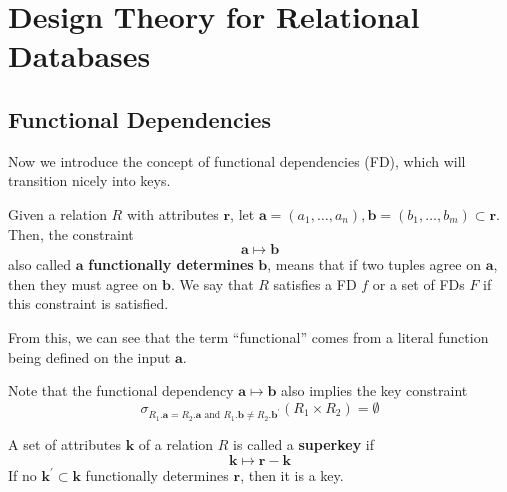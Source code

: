 \documentclass{article}
\begin{document}
\section{Design Theory for Relational Databases}

  \subsection{Functional Dependencies}

    Now we introduce the concept of functional dependencies (FD), which will transition nicely into keys.  

    \begin{definition}
      Given a relation $R$ with attributes $\mathbf{r}$, let $\mathbf{a} = (a_1, \ldots, a_n), \mathbf{b} = (b_1, \ldots, b_m) \subset \mathbf{r}$. Then, the constraint 
      \begin{equation}
        \mathbf{a} \mapsto \mathbf{b}
      \end{equation}
      also called $\mathbf{a}$ \textbf{functionally determines} $\mathbf{b}$, means that if two tuples agree on $\mathbf{a}$, then they must agree on $\mathbf{b}$. We say that $R$ satisfies a FD $f$ or a set of FDs $F$ if this constraint is satisfied. 
    \end{definition}

    From this, we can see that the term ``functional'' comes from a literal function being defined on the input $\mathbf{a}$. 

    \begin{lemma}
      Note that the functional dependency $\mathbf{a} \mapsto \mathbf{b}$ also implies the key constraint 
      \begin{equation}
        \sigma_{R_1.\mathbf{a} = R_2.\mathbf{a} \text{ and } R_1.\mathbf{b} \neq R_2.\mathbf{b}^\prime} (R_1 \times R_2) = \emptyset
      \end{equation}
    \end{lemma}

    \begin{definition}[Superkey]
      A set of attributes $\mathbf{k}$ of a relation $R$ is called a \textbf{superkey} if 
      \begin{equation}
        \mathbf{k} \mapsto \mathbf{r} - \mathbf{k}
      \end{equation}
      If no $\mathbf{k}^\prime \subset \mathbf{k}$ functionally determines $\mathbf{r}$, then it is a key. 
    \end{definition}
\end{document}
